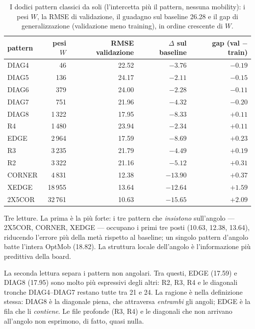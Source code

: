 \begin{table}[ht]
\centering
\begin{tabular}{lrrrr}
\toprule
pattern & pesi $W$ & RMSE validazione & $\Delta$ sul baseline & gap (val $-$ train) \\
\midrule
DIAG4  & 46      & 22.52 & $-3.76$  & $-0.19$ \\
DIAG5  & 136     & 24.17 & $-2.11$  & $-0.15$ \\
DIAG6  & 379     & 24.00 & $-2.28$  & $-0.11$ \\
DIAG7  & 751     & 21.96 & $-4.32$  & $-0.20$ \\
DIAG8  & 1\,322  & 17.95 & $-8.33$  & $+0.11$ \\
R4     & 1\,480  & 23.94 & $-2.34$  & $+0.11$ \\
EDGE   & 2\,964  & 17.59 & $-8.69$  & $+0.23$ \\
R3     & 3\,235  & 21.79 & $-4.49$  & $+0.19$ \\
R2     & 3\,322  & 21.16 & $-5.12$  & $+0.31$ \\
CORNER & 4\,831  & 12.38 & $-13.90$ & $+0.37$ \\
XEDGE  & 18\,955 & 13.64 & $-12.64$ & $+1.59$ \\
2X5COR & 32\,761 & 10.63 & $-15.65$ & $+2.09$ \\
\bottomrule
\end{tabular}
\caption{I dodici pattern classici da soli (l'intercetta più il
pattern, nessuna mobility): i pesi $W$, la RMSE di validazione, il
guadagno sul baseline 26.28 e il gap di generalizzazione (validazione
meno training), in ordine crescente di $W$.}
\label{tab:feature-base-pattern-risultati}
\end{table}

Tre letture. La prima è la più forte: i tre pattern che \emph{insistono}
sull'angolo — 2X5COR, CORNER, XEDGE — occupano i primi tre posti
(10.63, 12.38, 13.64), riducendo l'errore più della metà rispetto al
baseline; un singolo pattern d'angolo batte l'intera OptMob (18.82). La
struttura locale dell'angolo è l'informazione più predittiva della
board.

La seconda lettura separa i pattern non angolari. Tra questi, EDGE
(17.59) e DIAG8 (17.95) sono molto più espressivi degli altri: R2, R3,
R4 e le diagonali tronche DIAG4--DIAG7 restano tutte tra 21 e 24. La
ragione è nella definizione stessa: DIAG8 è la diagonale piena, che
attraversa \emph{entrambi} gli angoli; EDGE è la fila che li
\emph{contiene}. Le file profonde (R3, R4) e le diagonali che
non arrivano all'angolo non esprimono, di fatto, quasi nulla.

